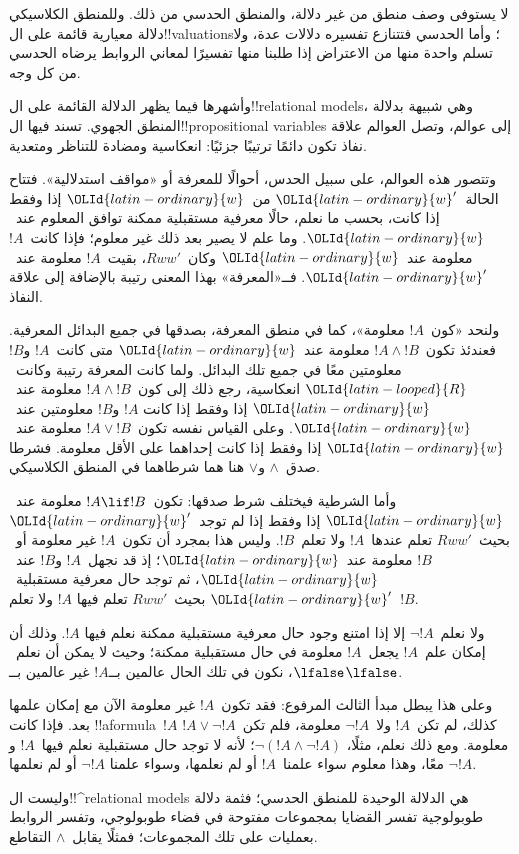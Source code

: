 \documentclass[../../../include/open-logic-section]{subfiles}
\begin{document}


لا يستوفى وصف منطق من غير دلالة، والمنطق الحدسي من ذلك. وللمنطق الكلاسيكي
دلالة معيارية قائمة على ال!!{valuation}s؛ وأما الحدسي فتتنازع تفسيره
دلالات عدة، ولا تسلم واحدة منها من الاعتراض إذا طلبنا منها تفسيرًا لمعاني
الروابط يرضاه الحدسي من كل وجه.

وأشهرها فيما يظهر الدلالة القائمة على ال!!{relational model}s، وهي شبيهة
بدلالة المنطق الجهوي. تسند فيها ال!!{propositional variable}s إلى عوالم،
وتصل العوالم علاقة نفاذ تكون دائمًا ترتيبًا جزئيًا: انعكاسية ومضادة للتناظر
ومتعدية.

وتتصور هذه العوالم، على سبيل الحدس، أحوالًا للمعرفة أو «مواقف استدلالية».
فتتاح الحالة~${\OLId{latin-ordinary}{w}}'$ من~${\OLId{latin-ordinary}{w}}$ إذا وفقط إذا كانت، بحسب ما نعلم، حالًا معرفية
مستقبلية ممكنة توافق المعلوم عند~${\OLId{latin-ordinary}{w}}$. وما علم لا يصير بعد ذلك غير معلوم؛
فإذا كانت~$!A$ معلومة عند~${\OLId{latin-ordinary}{w}}$ وكان~$Rww'$، بقيت~$!A$ معلومة عند~${\OLId{latin-ordinary}{w}}'$.
فــ«المعرفة» بهذا المعنى رتيبة بالإضافة إلى علاقة النفاذ.

ولنحد «كون~$!A$ معلومة»، كما في منطق المعرفة، بصدقها في جميع البدائل
المعرفية. فعندئذ تكون~$!A \land !B$ معلومة عند~${\OLId{latin-ordinary}{w}}$ متى كانت~$!A$ و$!B$
معلومتين معًا في جميع تلك البدائل. ولما كانت المعرفة رتيبة وكانت~${\OLId{latin-looped}{R}}$
انعكاسية، رجع ذلك إلى كون~$!A \land !B$ معلومة عند~${\OLId{latin-ordinary}{w}}$ إذا وفقط إذا كانت
$!A$ و$!B$ معلومتين عند~${\OLId{latin-ordinary}{w}}$. وعلى القياس نفسه تكون~$!A \lor !B$ معلومة
عند~${\OLId{latin-ordinary}{w}}$ إذا وفقط إذا كانت إحداهما على الأقل معلومة. فشرطا صدق~$\land$
و$\lor$ هنا هما شرطاهما في المنطق الكلاسيكي.

وأما الشرطية فيختلف شرط صدقها: تكون~$!A \lif !B$ معلومة عند~${\OLId{latin-ordinary}{w}}$ إذا وفقط
إذا لم توجد~${\OLId{latin-ordinary}{w}}'$ بحيث~$Rww'$ تعلم عندها~$!A$ ولا تعلم~$!B$. وليس هذا
بمجرد أن تكون~$!A$ غير معلومة أو~$!B$ معلومة عند~${\OLId{latin-ordinary}{w}}$؛ إذ قد نجهل~$!A$
و$!B$ عند~${\OLId{latin-ordinary}{w}}$، ثم توجد حال معرفية مستقبلية~${\OLId{latin-ordinary}{w}}'$ بحيث~$Rww'$ تعلم فيها
$!A$ ولا تعلم~$!B$.

ولا نعلم~$\lnot !A$ إلا إذا امتنع وجود حال معرفية مستقبلية ممكنة نعلم فيها
$!A$. وذلك أن إمكان علم~$!A$ يجعل~$!A$ معلومة في حال مستقبلية ممكنة؛ وحيث
لا يمكن أن نعلم~$\lfalse$، نكون في تلك الحال عالمين بــ$!A$ غير عالمين
بــ$\lfalse$.

وعلى هذا يبطل مبدأ الثالث المرفوع: فقد تكون~$!A$ غير معلومة الآن مع إمكان
علمها بعد. فإذا كانت !!a{formula}~$!A$ كذلك، لم تكن~$!A$ ولا~$\lnot !A$
معلومة، فلم تكن~$!A \lor \lnot !A$ معلومة. ومع ذلك نعلم، مثلًا،
$\lnot(!A \land \lnot !A)$؛ لأنه لا توجد حال مستقبلية نعلم فيها~$!A$
و$\lnot !A$ معًا، وهذا معلوم سواء علمنا~$!A$ أو لم نعلمها، وسواء علمنا
$\lnot !A$ أو لم نعلمها.

وليست ال!!^{relational model}s هي الدلالة الوحيدة للمنطق الحدسي؛ فثمة
دلالة طوبولوجية تفسر القضايا بمجموعات مفتوحة في فضاء طوبولوجي، وتفسر
الروابط بعمليات على تلك المجموعات؛ فمثلًا يقابل~$\land$ التقاطع.
\end{document}
